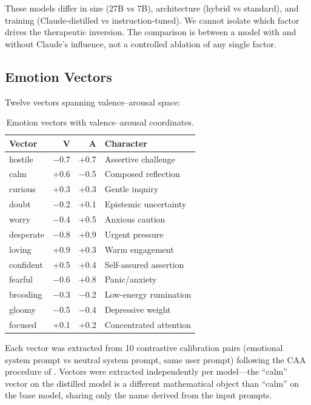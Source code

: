 \documentclass[11pt,a4paper]{article}
\begin{document}
These models differ in size (27B vs 7B), architecture (hybrid vs
standard), and training (Claude-distilled vs instruction-tuned). We
cannot isolate which factor drives the therapeutic inversion. The
comparison is between a model with and without Claude's influence, not a
controlled ablation of any single factor.

\subsection{Emotion Vectors}

Twelve vectors spanning valence--arousal space:

\begin{table}[h]
\centering
\caption{Emotion vectors with valence--arousal coordinates.}
\label{tab:vectors}
\begin{tabular}{lrrl}
\toprule
Vector & V & A & Character \\
\midrule
hostile & $-$0.7 & +0.7 & Assertive challenge \\
calm & +0.6 & $-$0.5 & Composed reflection \\
curious & +0.3 & +0.3 & Gentle inquiry \\
doubt & $-$0.2 & +0.1 & Epistemic uncertainty \\
worry & $-$0.4 & +0.5 & Anxious caution \\
desperate & $-$0.8 & +0.9 & Urgent pressure \\
loving & +0.9 & +0.3 & Warm engagement \\
confident & +0.5 & +0.4 & Self-assured assertion \\
fearful & $-$0.6 & +0.8 & Panic/anxiety \\
brooding & $-$0.3 & $-$0.2 & Low-energy rumination \\
gloomy & $-$0.5 & $-$0.4 & Depressive weight \\
focused & +0.1 & +0.2 & Concentrated attention \\
\bottomrule
\end{tabular}
\end{table}

Each vector was extracted from 10 contrastive calibration pairs
(emotional system prompt vs neutral system prompt, same user prompt)
following the CAA procedure of \citet{turner2023activation}. Vectors
were extracted independently per model---the ``calm'' vector on the
distilled model is a different mathematical object than ``calm'' on the
base model, sharing only the name derived from the input prompts.
\end{document}
